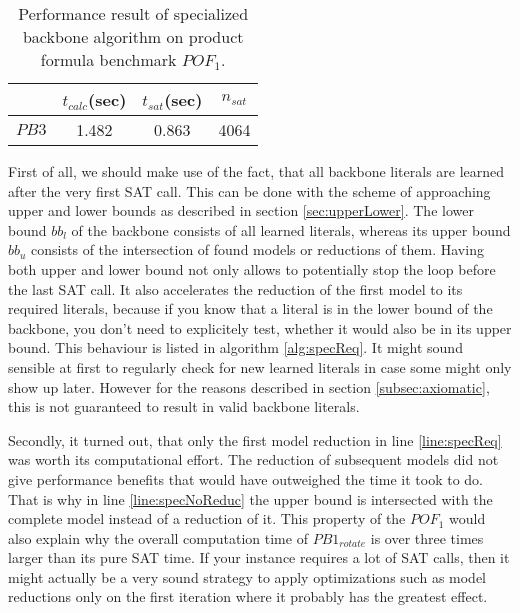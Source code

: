 \begin{table}[h]
\centering
\begin{tabular}{l| c c c }
&	$t_{calc}$(sec) &	$t_{sat}$(sec)	& $n_{sat}$ \\
\hline
$PB3$ & 1.482 & 0.863 & 4064 \\
\end{tabular}
\caption[Performance result of specialized backbone algorithm]{Performance result of specialized backbone algorithm on product formula benchmark $POF_1$.}
\label{tab:thoreSpecialResults}
\end{table}

First of all, we should make use of the fact, that all backbone literals are learned after the very first SAT call. This can be done with the scheme of approaching upper and lower bounds as described in section \ref{sec:upperLower}. The lower bound $bb_l$ of the backbone consists of all learned literals, whereas its upper bound $bb_u$ consists of the intersection of found models or reductions of them. Having both upper and lower bound not only allows to potentially stop the loop before the last SAT call. It also accelerates the reduction of the first model to its required literals, because if you know that a literal is in the lower bound of the backbone, you don't need to explicitely test, whether it would also be in its upper bound. This behaviour is listed in algorithm \ref{alg:specReq}. It might sound sensible at first to regularly check for new learned literals in case some might only show up later. However for the reasons described in section \ref{subsec:axiomatic}, this is not guaranteed to result in valid backbone literals.

Secondly, it turned out, that only the first model reduction in line \ref{line:specReq} was worth its computational effort. The reduction of subsequent models did not give performance benefits that would have outweighed the time it took to do. That is why in line \ref{line:specNoReduc} the upper bound is intersected with the complete model instead of a reduction of it. This property of the $POF_1$ would also explain why the overall computation time of $PB1_{rotate}$ is over three times larger than its pure SAT time. If your instance requires a lot of SAT calls, then it might actually be a very sound strategy to apply optimizations such as model reductions only on the first iteration where it probably has the greatest effect. 


